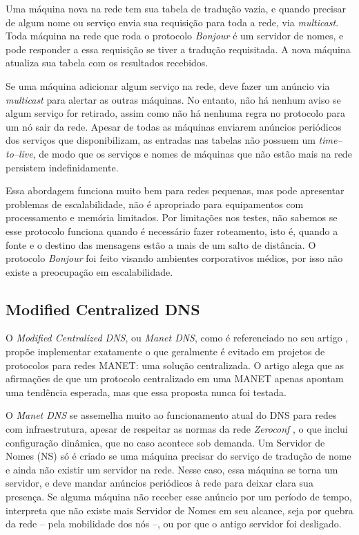         Uma máquina nova na rede tem sua tabela de tradução vazia, e quando 
        precisar de algum nome ou serviço envia sua requisição para toda a rede,
        via \textit{multicast}. Toda máquina na rede que roda o protocolo
        \textit{Bonjour} é um servidor de nomes, e pode responder a essa 
        requisição se tiver a tradução requisitada. A nova máquina atualiza sua 
        tabela com os resultados recebidos.

        Se uma máquina adicionar algum serviço na rede, deve fazer um anúncio via
        \textit{multicast} para alertar as outras máquinas. No entanto, não há 
        nenhum aviso se algum serviço for retirado, assim como não há nenhuma 
        regra no protocolo para um nó sair da rede. Apesar de todas as máquinas 
        enviarem anúncios periódicos dos serviços que disponibilizam, as entradas
        nas tabelas não possuem um \textit{time--to--live}, de modo que os serviços
        e nomes de máquinas que não estão mais na rede persistem indefinidamente.

        Essa abordagem funciona muito bem para redes pequenas, mas pode apresentar
        problemas de escalabilidade, não é apropriado para equipamentos com 
        processamento e memória limitados. Por limitações nos testes, não sabemos
        se esse protocolo funciona quando é necessário fazer roteamento, isto é,
        quando a fonte e o destino das mensagens estão a mais de um salto de 
        distância. O protocolo \textit{Bonjour} foi feito visando ambientes 
        corporativos médios, por isso não existe a preocupação em escalabilidade.


\subsection{Modified Centralized DNS}
\label{MCDNS}

    O \textit{Modified Centralized DNS}, ou \textit{Manet DNS}, como é referenciado
    no seu artigo \cite{mcdns}, propõe implementar exatamente o que geralmente é
    evitado em projetos de protocolos para redes MANET: uma solução centralizada.
    O artigo alega que as afirmações de que um protocolo centralizado em uma MANET
    apenas apontam uma tendência esperada, mas que essa proposta nunca foi testada.
  
    O \textit{Manet DNS} se assemelha muito ao funcionamento atual do DNS para 
    redes com infraestrutura, apesar de respeitar as normas da rede \textit{Zeroconf}
    \cite{zeroconf}, o que inclui configuração dinâmica, que no caso acontece sob
    demanda. Um Servidor de Nomes (NS) só é criado se uma máquina precisar do 
    serviço de tradução de nome e ainda não existir um servidor na rede. Nesse 
    caso, essa máquina se torna um servidor, e deve mandar anúncios periódicos à
    rede para deixar clara sua presença. Se alguma máquina não receber esse
    anúncio por um período de tempo, interpreta que não existe mais Servidor de 
    Nomes em seu alcance, seja por quebra da rede -- pela mobilidade dos nós --,
    ou por que o antigo servidor foi desligado.
  
